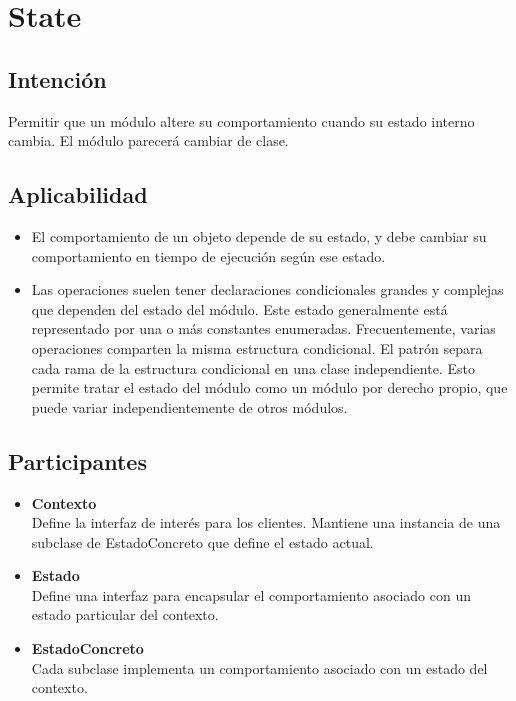 \section{State}

\label{anexoState}

\subsection*{Intención}

Permitir que un módulo altere su comportamiento cuando su estado interno cambia. El módulo parecerá cambiar de clase.

\subsection*{Aplicabilidad}

\begin{itemize}
\item El comportamiento de un objeto depende de su estado, y debe cambiar su comportamiento en tiempo de ejecución según ese estado.
\item Las operaciones suelen tener declaraciones condicionales grandes y complejas que dependen del estado del módulo. Este estado generalmente está representado por una o más constantes enumeradas. Frecuentemente, varias operaciones comparten la misma estructura condicional. El patrón separa cada rama de la estructura condicional en una clase independiente. Esto permite tratar el estado del módulo como un módulo por derecho propio, que puede variar independientemente de otros módulos.
\end{itemize}

\subsection*{Participantes}

\begin{itemize}
\item \textbf{Contexto}\\
Define la interfaz de interés para los clientes. Mantiene una instancia de una subclase de EstadoConcreto que define el estado actual.

\item \textbf{Estado}\\
Define una interfaz para encapsular el comportamiento asociado con un estado particular del contexto.

\item \textbf{EstadoConcreto}\\
Cada subclase implementa un comportamiento asociado con un estado del contexto.
\end{itemize}


